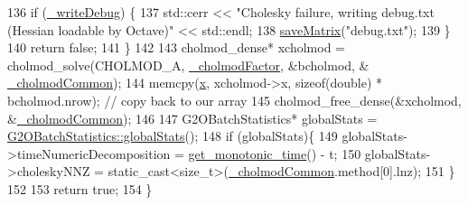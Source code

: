 \begin{DoxyCode}
136         \textcolor{keywordflow}{if} (\hyperlink{classg2o_1_1LinearSolverCholmod_ab13b752d37f43b2d8e1e4b2c7002b054}{\_writeDebug}) \{
137           std::cerr << \textcolor{stringliteral}{"Cholesky failure, writing debug.txt (Hessian loadable by Octave)"} << std::endl;
138           \hyperlink{classg2o_1_1LinearSolverCholmod_a93f03e43f45ed73cc2becd4c8d77f5f4}{saveMatrix}(\textcolor{stringliteral}{"debug.txt"});
139         \}
140         \textcolor{keywordflow}{return} \textcolor{keyword}{false};
141       \}
142 
143       cholmod\_dense* xcholmod = cholmod\_solve(CHOLMOD\_A, \hyperlink{classg2o_1_1LinearSolverCholmod_a674a54287f98130c4aab303508ab945b}{\_cholmodFactor}, &bcholmod, &
      \hyperlink{classg2o_1_1LinearSolverCholmod_ae7def9c6bf341e0d2f3a3936121fefa1}{\_cholmodCommon});
144       memcpy(\hyperlink{sparse__block__matrix_8hpp_af88b946fb90d5f08b5fb740c70e98c10}{x}, xcholmod->x, \textcolor{keyword}{sizeof}(\textcolor{keywordtype}{double}) * bcholmod.nrow); \textcolor{comment}{// copy back to our array}
145       cholmod\_free\_dense(&xcholmod, &\hyperlink{classg2o_1_1LinearSolverCholmod_ae7def9c6bf341e0d2f3a3936121fefa1}{\_cholmodCommon});
146 
147       G2OBatchStatistics* globalStats = \hyperlink{structg2o_1_1G2OBatchStatistics_a06f9c667d8b48b8f0023e27011818b64}{G2OBatchStatistics::globalStats}();
148       \textcolor{keywordflow}{if} (globalStats)\{
149         globalStats->timeNumericDecomposition = \hyperlink{namespaceg2o_aa64237935c7d8411b4369234a5f661ea}{get\_monotonic\_time}() - t;
150         globalStats->choleskyNNZ = \textcolor{keyword}{static\_cast<}\textcolor{keywordtype}{size\_t}\textcolor{keyword}{>}(\hyperlink{classg2o_1_1LinearSolverCholmod_ae7def9c6bf341e0d2f3a3936121fefa1}{\_cholmodCommon}.method[0].lnz);
151       \}
152 
153       \textcolor{keywordflow}{return} \textcolor{keyword}{true};
154     \}
\end{DoxyCode}
